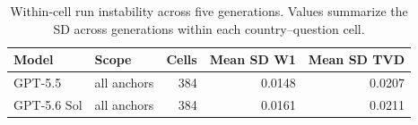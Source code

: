 \begin{table}[!htbp]
\centering
\caption{Within-cell run instability across five generations. Values summarize the SD across generations within each country--question cell.}
\label{tab:run-stability}
\small
\begin{tabular}{llrrr}
\toprule
\rowcolor{tablehead} Model & Scope & Cells & Mean SD W1 & Mean SD TVD \\
\midrule
GPT-5.5 & all anchors & 384 & 0.0148 & 0.0207 \\
GPT-5.6 Sol & all anchors & 384 & 0.0161 & 0.0211 \\
\bottomrule
\end{tabular}
\end{table}
\FloatBarrier
